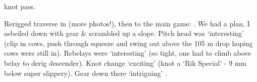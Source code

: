 \begin{marginfigure}
\checkoddpage \ifoddpage \forcerectofloat \else \forceversofloat \fi
\centering
 \caption{\protect{} knot pass. }
 \label{knotpass plopzilla}
\end{marginfigure}


Rerigged traverse in  (more photos!), then to the main game:
. We had a plan, I asbeiled down with gear \& scrambled
up a slope. Pitch head was `interesting' (clip in cows, push through
squeeze and swing out above the 105 m drop hoping cows were still in).
Rebelays were `interesting' (so tight, one had to climb above belay to
derig descender). Knot change `exciting' (knot a `Rik Special' - 9 mm
below super slippery). Gear down there `intriguing'
.

